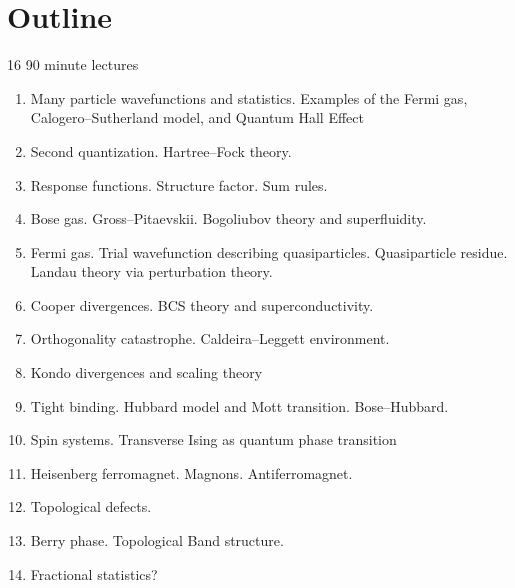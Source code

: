 \section{Outline}

16 90 minute lectures

\begin{enumerate}
\item Many particle wavefunctions and statistics. Examples of the Fermi gas, Calogero--Sutherland model, and Quantum Hall Effect

\item Second quantization. Hartree--Fock theory.

\item Response functions. Structure factor. Sum rules. 

\item Bose gas. Gross--Pitaevskii. Bogoliubov theory and superfluidity.

\item Fermi gas. Trial wavefunction describing quasiparticles. Quasiparticle residue. Landau theory via perturbation theory. 

\item Cooper divergences. BCS theory and superconductivity. 

\item Orthogonality catastrophe. Caldeira--Leggett environment.

\item Kondo divergences and scaling theory

\item Tight binding. Hubbard model and Mott transition. Bose--Hubbard.

\item Spin systems. Transverse Ising as quantum phase transition

\item Heisenberg ferromagnet. Magnons. Antiferromagnet.

\item Topological defects.

\item Berry phase. Topological Band structure.

\item Fractional statistics?
\end{enumerate}